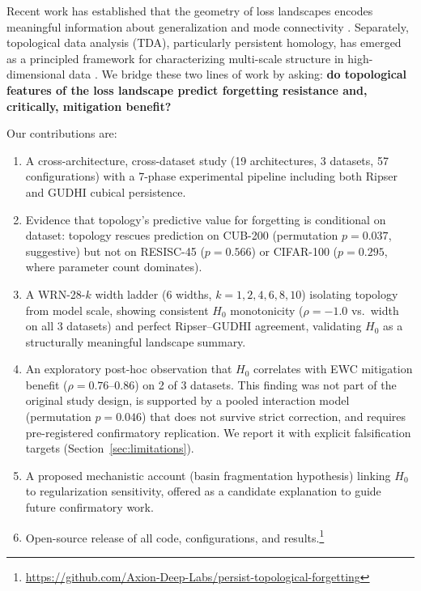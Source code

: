 \documentclass[10pt,twocolumn]{article}
\begin{document}
Recent work has established that the geometry of loss landscapes encodes meaningful information about generalization \citep{li2018visualizing, keskar2017on} and mode connectivity \citep{garipov2018loss}. Separately, topological data analysis (TDA), particularly persistent homology, has emerged as a principled framework for characterizing multi-scale structure in high-dimensional data \citep{carlsson2009topology}. We bridge these two lines of work by asking: \textbf{do topological features of the loss landscape predict forgetting resistance and, critically, mitigation benefit?}

Our contributions are:
\begin{enumerate}
    \item A cross-architecture, cross-dataset study (19 architectures, 3 datasets, 57 configurations) with a 7-phase experimental pipeline including both Ripser and GUDHI cubical persistence.
    \item Evidence that topology's predictive value for forgetting is conditional on dataset: topology rescues prediction on CUB-200 (permutation $p = 0.037$, suggestive) but not on RESISC-45 ($p = 0.566$) or CIFAR-100 ($p = 0.295$, where parameter count dominates).
    \item A WRN-28-$k$ width ladder (6 widths, $k = 1, 2, 4, 6, 8, 10$) isolating topology from model scale, showing consistent $H_0$ monotonicity ($\rho = -1.0$ vs.\ width on all 3 datasets) and perfect Ripser--GUDHI agreement, validating $H_0$ as a structurally meaningful landscape summary.
    \item An exploratory post-hoc observation that $H_0$ correlates with EWC mitigation benefit ($\rho = 0.76$--$0.86$) on 2 of 3 datasets. This finding was not part of the original study design, is supported by a pooled interaction model (permutation $p = 0.046$) that does not survive strict correction, and requires pre-registered confirmatory replication. We report it with explicit falsification targets (Section~\ref{sec:limitations}).
    \item A proposed mechanistic account (basin fragmentation hypothesis) linking $H_0$ to regularization sensitivity, offered as a candidate explanation to guide future confirmatory work.
    \item Open-source release of all code, configurations, and results.\footnote{\url{https://github.com/Axion-Deep-Labs/persist-topological-forgetting}}
\end{enumerate}

\end{document}
